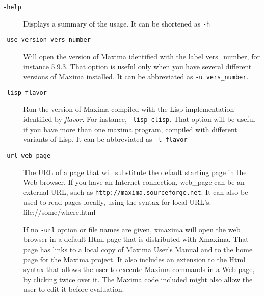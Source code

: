 \documentclass[12pt,makeidx,maxima]{book}
\begin{document}
\begin{description}
\item[\texttt{-help}] Displays a summary of the usage. It can be shortened
  as \texttt{-h}
\item[\texttt{-use-version vers\_number}] Will open the version of Maxima
  identified with the label vers\_number, for instance 5.9.3. That option is
  useful only when you have several different versions of Maxima
  installed. It can be abbreviated as \texttt{-u vers\_number}.
\item[\texttt{-lisp flavor}] Run the version of Maxima compiled with the
   Lisp implementation identified by \emph{flavor}. For instance, \texttt{-lisp
    clisp}. That option will be useful if you have more than one maxima
  program, compiled with different variants of Lisp. It can be abbreviated
  as \texttt{-l flavor}
\item[\texttt{-url web\_page}] The URL of a page that will substitute the
  default starting page in the Web browser. If you have an Internet
  connection, web\_page can be an external URL, such as
  \texttt{http://maxima.sourceforge.net}. It can also be used to read pages
  locally, using the syntax for local URL's: file://some/where.html

  If no \texttt{-url} option or file names are given, xmaxima will open the
  web browser in a default Html page that is distributed with Xmaxima. That
  page has links to a local copy of Maxima User's Manual
   and to the home page for the Maxima
  project. It also includes an extension to the Html syntax that allows the
  user to execute Maxima commands in a Web page, by clicking twice over it.
  The Maxima code included might also allow the user to edit it before
  evaluation.

\end{description}


\end{document}
